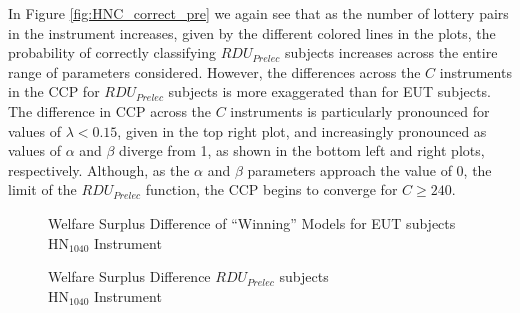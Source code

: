 \documentclass[../main.tex]{subfiles}
\begin{document}
In Figure \ref{fig:HNC_correct_pre} we again see that as the number of lottery pairs in the instrument increases, given by the different colored lines in the plots, the probability of correctly classifying $\mathit{RDU_{Prelec}}$ subjects increases across the entire range of parameters considered.
However, the differences across the $C$ instruments in the CCP for $\mathit{RDU_{Prelec}}$ subjects is more exaggerated than for EUT subjects.
The difference in CCP across the $C$ instruments is particularly pronounced for values of $\lambda < 0.15$, given in the top right plot, and increasingly pronounced as values of $\alpha$ and $\beta$ diverge from 1, as shown in the bottom left and right plots, respectively.
Although, as the $\alpha$ and $\beta$ parameters approach the value of 0, the limit of the $\mathit{RDU_{Prelec}}$ function, the CCP begins to converge for $C \geq 240$.

\begin{figure}[h!]
	\center
	\caption{Welfare Surplus Difference of \enquote{Winning} Models for EUT subjects\\$\text{HN}_{1040}$ Instrument}
	\label{fig:HN_wel_eut}
\end{figure}

\begin{figure}[h!]
	\center
	\caption{Welfare Surplus Difference $\mathit{RDU_{Prelec}}$ subjects\\$\text{HN}_{1040}$ Instrument}
	\label{fig:HN_wel_pre}
\end{figure}
\end{document}
